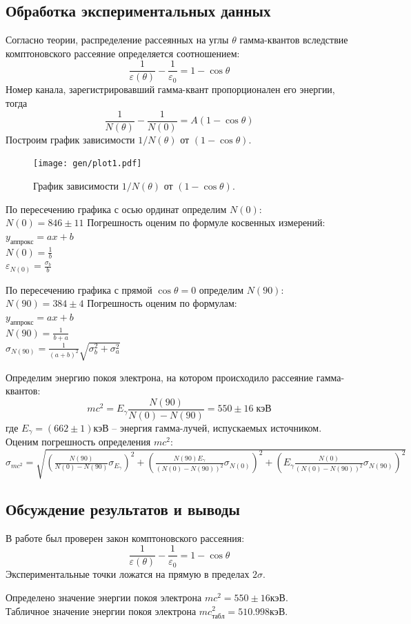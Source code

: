 \documentclass[10pt,a4paper]{article}
\begin{document}
	\subsection*{Обработка экспериментальных данных}
	
	Согласно теории, распределение рассеянных на углы $\theta$ гамма-квантов вследствие комптоновского рассеяние определяется соотношением: 
	$$
	\frac{1}{\varepsilon(\theta)} - \frac{1}{\varepsilon_0} = 1 - \cos \theta
	$$
	Номер канала, зарегистрировавший гамма-квант пропорционален его энергии, тогда
	$$
	\frac{1}{N(\theta)} - \frac{1}{N(0)} = A (1 - \cos \theta)
	$$
	Построим график зависимости $1/N(\theta)$ от $(1 - \cos \theta)$.\\
	\begin{figure}
		\centering
		\texttt{[image: gen/plot1.pdf]}
		\caption{График зависимости $1/N(\theta)$ от $(1 - \cos \theta)$.}
	\end{figure}

	По пересечению графика с осью ординат определим $N(0)$:\\
	$N(0) = 846 \pm 11$
	Погрешность оценим по формуле косвенных измерений: \\
	$y_{аппрокс} = ax + b$\\
	$N(0) = \frac{1}{b}$\\
	$\varepsilon_{N(0)} = \frac{\sigma_b}{b}$
	
	По пересечению графика с прямой $\cos \theta = 0$ определим $N(90)$:\\
	$N(90) = 384 \pm 4$
	Погрешность оценим по формулам: \\
	$y_{аппрокс} = ax + b$\\
	$N(90) = \frac{1}{b + a}$ \\
	$\sigma_{N(90)} = \frac{1}{(a + b)^2}\sqrt{\sigma_b^2 + \sigma_a^2}$
	
	Определим энергию покоя электрона, на котором происходило рассеяние гамма-квантов: \\
	$$
	mc^2 = E_\gamma \frac{N(90)}{N(0) - N(90)} = 550 \pm 16 \; кэВ
	$$
	где $E_\gamma = (662\pm1) кэВ$ -- энергия гамма-лучей, испускаемых источником. Оценим погрешность определения $mc^2$:\\
	$\sigma_{mc^2} = \sqrt{(\frac{N(90)}{N(0) - N(90)} \sigma_{E_\gamma})^2 + (\frac{N(90) E_\gamma}{(N(0) - N(90))^2} \sigma_{N(0)})^2 + (E_\gamma \frac{N(0)}{(N(0) - N(90))^2}\sigma_{N(90)})^2}$
	
	\subsection*{Обсуждение результатов и выводы}
	
	В работе был проверен закон комптоновского рассеяния:
	$$
	\frac{1}{\varepsilon(\theta)} - \frac{1}{\varepsilon_0} = 1 - \cos \theta
	$$
	Экспериментальные точки ложатся на прямую в пределах $2\sigma$.
	
	Определено значение энергии покоя электрона $mc^2 = 550 \pm 16 кэВ$. \\
	Табличное значение энергии покоя электрона $mc^2_{табл} = 510.998 кэВ$.
	
\end{document}
